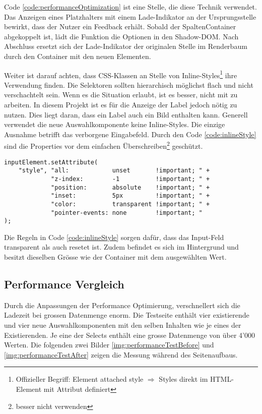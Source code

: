 Code \ref{code:performanceOptimization} ist eine Stelle, die diese Technik verwendet. 
Das Anzeigen eines Platzhalters mit einem Lade-Indikator an der Ursprungsstelle bewirkt, dass der Nutzer ein Feedback erhält. 
Sobald der SpaltenContainer abgekoppelt ist, lädt die Funktion die Optionen in den Shadow-DOM. 
Nach Abschluss ersetzt sich der Lade-Indikator der originalen Stelle im Renderbaum durch den Container mit den neuen Elementen. 

Weiter ist darauf achten, dass CSS-Klassen an Stelle von Inline-Styles\footnote{
    Offizieller Begriff: Element attached style $\Rightarrow$ Styles direkt im HTML-Element mit Attribut  definiert
} ihre Verwendung finden. 
Die Selektoren sollten hierarchisch möglichst flach und nicht verschachtelt sein. 
Wenn es die Situation erlaubt, ist es besser, nicht mit  zu arbeiten. 
In diesem Projekt ist es für die Anzeige der Label jedoch nötig  zu nutzen. 
Dies liegt daran, dass ein Label auch ein Bild enthalten kann. 
Generell verwendet die neue Auswahlkomponente keine Inline-Styles. 
Die einzige Ausnahme betrifft das verborgene Eingabefeld. 
Durch den Code \ref{code:inlineStyle} sind die Properties vor dem einfachen Überschreiben\footnote{
     besser nicht verwenden
} geschützt. 

\begin{lstlisting}[style = htmlcssjs, caption = Inline-Style für Input-Feld, label = code:inlineStyle]
inputElement.setAttribute(
    "style", "all:            unset       !important; " +
             "z-index:        -1          !important; " +
             "position:       absolute    !important; " +
             "inset:          5px         !important; " +
             "color:          transparent !important; " +
             "pointer-events: none        !important; "
);
\end{lstlisting}

Die Regeln in Code \ref{code:inlineStyle} sorgen dafür, dass das Input-Feld transparent als auch resetet ist. 
Zudem befindet es sich im Hintergrund und besitzt dieselben Grösse wie der Container mit dem ausgewählten Wert. 


\subsection{Performance Vergleich}
\label{sec:performanceCompare}

Durch die Anpassungen der Performance Optimierung, verschnellert sich die Ladezeit bei grossen Datenmenge enorm. 
Die Testseite enthält vier existierende und vier neue Auswahlkomponenten mit den selben Inhalten wie je eines der Existierenden. 
Je eine der Selects enthält eine grosse Datenmenge von über 4'000 Werten. 
Die folgenden zwei Bilder \ref{img:performanceTestBefore} und \ref{img:performanceTestAfter} zeigen die Messung während des Seitenaufbaus. 

